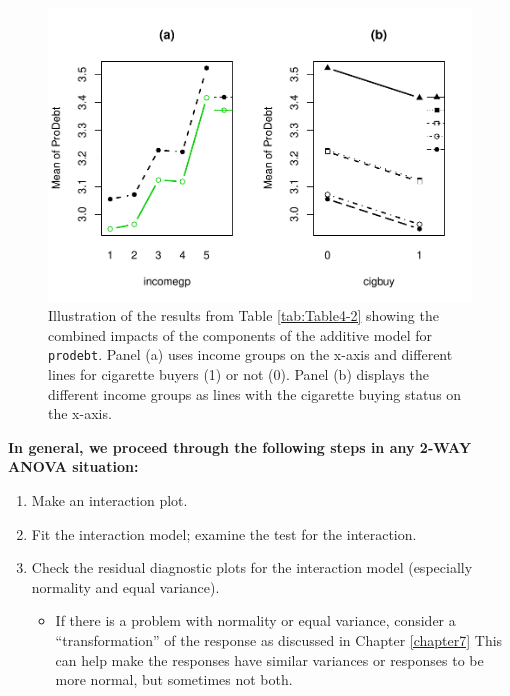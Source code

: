 \documentclass[]{book}
\providecommand{\tightlist}{%
  \setlength{\itemsep}{0pt}\setlength{\parskip}{0pt}}
\theoremstyle{definition}
\theoremstyle{definition}
\theoremstyle{remark}
\begin{document}
\begin{figure}
\centering
\includegraphics{04-twoWayAnova_files/figure-latex/Figure4-16-1.pdf}
\caption{\label{fig:Figure4-16}Illustration of the results from Table \ref{tab:Table4-2}
showing the combined impacts of the components of the additive model for
\texttt{prodebt}. Panel (a) uses income groups on the x-axis and
different lines for cigarette buyers (1) or not (0). Panel (b) displays
the different income groups as lines with the cigarette buying status on
the x-axis.}
\end{figure}

\textbf{In general, we proceed through the following steps in any 2-WAY
ANOVA situation:}

\begin{enumerate}
\def\labelenumi{\arabic{enumi}.}
\item
  Make an interaction plot.
\item
  Fit the interaction model; examine the test for the interaction.
\item
  Check the residual diagnostic plots for the interaction model
  (especially normality and equal variance).

  \begin{itemize}
  \tightlist
  \item
    If there is a problem with normality or equal variance, consider a
    ``transformation'' of the response as discussed in Chapter
    \ref{chapter7} This can help make the responses have similar
    variances or responses to be more normal, but sometimes not both.
  \end{itemize}
\end{enumerate}
\end{document}

